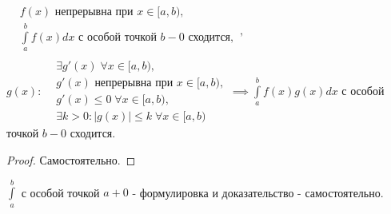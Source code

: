 \documentclass[../main.tex]{subfiles}
\begin{document}
\begin{theorem}
$\begin{aligned}
    &f(x) \text{ непрерывна при } x\in [a,b), \\ 
    &\int\limits_{a  }^{b    } f(x)dx \text{ с особой точкой $b-0$ сходится},\\
\end{aligned},$ $g(x): \begin{aligned}
    &\exists g'(x) \; \forall x\in [a,b),\\
    &g'(x) \text{ непрерывна при } x\in [a,b),\\
    &g'(x)\leqslant 0 \; \forall x\in [a,b),\\
    &\exists k>0: |g(x)|\leqslant k \; \forall x\in [a,b)
\end{aligned} \implies \int\limits_{a   }^{b} f(x)g(x)dx $ с особой точкой $b-0$ сходится.
\end{theorem}
\begin{proof}
Самостоятельно.
\end{proof}
$\int\limits_{a }^{b    } $ с особой точкой $a+0$ - формулировка и доказательство - самостоятельно. 
\end{document}
